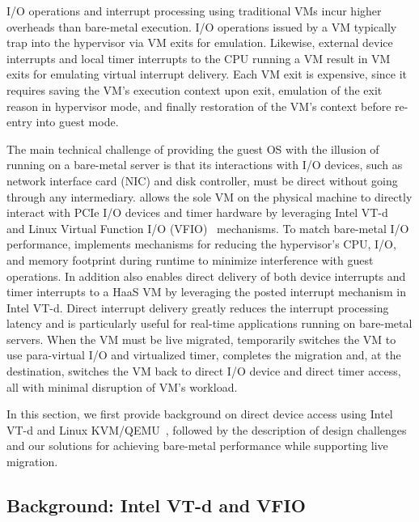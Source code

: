 I/O operations and interrupt processing using traditional VMs incur higher overheads than bare-metal execution. 
I/O operations issued by a VM typically trap into the hypervisor via VM exits for emulation.
Likewise, external device interrupts and local timer interrupts 
to the CPU running a VM result in VM exits for emulating virtual interrupt delivery.
Each VM exit is expensive, since it requires saving the VM's execution context upon exit,
emulation of the exit reason in hypervisor mode, 
and finally restoration of the VM's context before re-entry into guest mode.

The main technical challenge of providing the guest OS with the illusion of running on 
a bare-metal server is that its interactions with I/O devices, such as network 
interface card (NIC) and disk controller, must be direct without going through any intermediary.
\na allows the sole VM on the physical machine to directly interact with PCIe I/O devices and 
timer hardware by leveraging Intel VT-d~\cite{intelvtd-paper} and 
Linux Virtual Function I/O (VFIO)~\cite{vfio} mechanisms. 
To match bare-metal I/O performance, \na implements mechanisms 
for reducing the hypervisor's CPU, I/O, and memory 
footprint during runtime to minimize interference with guest operations.
In addition \na also enables direct delivery of both device interrupts
and timer interrupts to a HaaS VM by leveraging
the posted interrupt mechanism in Intel VT-d.
Direct interrupt delivery greatly reduces the interrupt processing latency and is
particularly useful for real-time applications running on bare-metal servers. 
When the VM must be live migrated, \na temporarily switches the VM to use
para-virtual I/O and virtualized timer, completes the migration
and, at the destination, switches the VM back to direct I/O device and direct 
timer access, all with minimal disruption of VM's workload.

In this section, we first  provide background on direct device access using 
Intel VT-d and Linux KVM/QEMU~\cite{kvm}, followed by the description of design challenges 
and our solutions for achieving bare-metal performance while supporting live migration.

\subsection{Background: Intel VT-d and VFIO}

